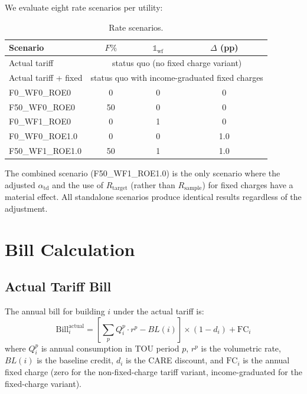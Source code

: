 \documentclass[11pt]{article}
\begin{document}
We evaluate eight rate scenarios per utility:

\begin{table}[htbp]
\centering
\caption{Rate scenarios.}
\small
\begin{tabular}{l c c c}
\toprule
\textbf{Scenario} & $F\%$ & $\mathbb{1}_{\text{wf}}$ & $\Delta$ (pp) \\
\midrule
Actual tariff & \multicolumn{3}{c}{status quo (no fixed charge variant)} \\
Actual tariff + fixed & \multicolumn{3}{c}{status quo with income-graduated fixed charges} \\
F0\_WF0\_ROE0 & 0 & 0 & 0 \\
F50\_WF0\_ROE0 & 50 & 0 & 0 \\
F0\_WF1\_ROE0 & 0 & 1 & 0 \\
F0\_WF0\_ROE1.0 & 0 & 0 & 1.0 \\
F50\_WF1\_ROE1.0 & 50 & 1 & 1.0 \\
\bottomrule
\end{tabular}
\end{table}

The combined scenario (F50\_WF1\_ROE1.0) is the only scenario where the adjusted $\alpha_{\text{td}}$ and the use of $R_{\text{target}}$ (rather than $R_{\text{sample}}$) for fixed charges have a material effect. All standalone scenarios produce identical results regardless of the adjustment.

\section{Bill Calculation}
\label{sec:bill_calc}

\subsection{Actual Tariff Bill}

The annual bill for building $i$ under the actual tariff is:
\begin{equation}
\text{Bill}_i^{\text{actual}} = \left[\sum_p Q_i^p \cdot r^p - BL(i)\right] \times (1 - d_i) + \text{FC}_i
\label{eq:actual_bill}
\end{equation}
where $Q_i^p$ is annual consumption in TOU period $p$, $r^p$ is the volumetric rate, $BL(i)$ is the baseline credit, $d_i$ is the CARE discount, and $\text{FC}_i$ is the annual fixed charge (zero for the non-fixed-charge tariff variant, income-graduated for the fixed-charge variant).
\end{document}
